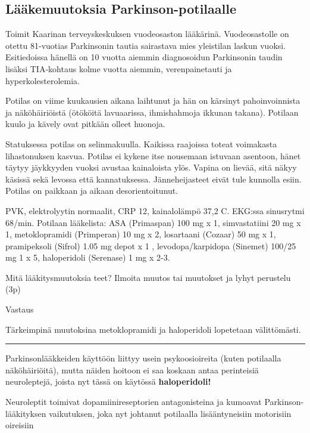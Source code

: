 \documentclass[
]{book}
\begin{document}
\subsection{Lääkemuutoksia Parkinson-potilaalle}\label{luxe4uxe4kemuutoksia-parkinson-potilaalle}

Toimit Kaarinan terveyskeskuksen vuodeosaston lääkärinä. Vuodeosastolle on otettu 81-vuotias Parkinsonin tautia sairastava mies yleistilan laskun vuoksi. Esitiedoissa
hänellä on 10 vuotta aiemmin diagnosoidun Parkinsonin taudin lisäksi TIA-kohtaus kolme vuotta aiemmin, verenpainetauti ja hyperkolesterolemia.

Potilas on viime kuukausien aikana laihtunut ja hän on kärsinyt pahoinvoinnista ja näköhäiriöistä (ötököitä lavuaarissa, ihmishahmoja ikkunan takana). Potilaan kuulo ja kävely ovat pitkään olleet huonoja.

Statuksessa potilas on selinmakuulla. Kaikissa raajoissa toteat voimakasta lihastonuksen kasvua. Potilas ei kykene itse nousemaan istuvaan asentoon, hänet täytyy jäykkyyden vuoksi avustaa kainaloista ylös. Vapina on lievää, sitä näkyy käsissä sekä levossa että kannatuksessa. Jänneheijasteet eivät tule kunnolla esiin. Potilas on paikkaan ja aikaan desorientoitunut.

PVK, elektrolyytin normaalit, CRP 12, kainalolämpö 37,2 C. EKG:ssa sinusrytmi 68/min. Potilaan lääkelista: ASA (Primaspan) 100 mg x 1, simvastatiini 20 mg x 1, metoklopramidi (Primperan) 10 mg x 2, losartaani (Cozaar) 50 mg x 1, pramipeksoli (Sifrol) 1.05 mg depot x 1 , levodopa/karpidopa (Sinemet) 100/25 mg 1 x 5, haloperidoli (Serenase) 1 mg x 2-3.

Mitä lääkitysmuutoksia teet? Ilmoita muutos tai muutokset ja lyhyt perustelu (3p)

Vastaus

Tärkeimpinä muutoksina metoklopramidi ja haloperidoli lopetetaan välittömästi.

\begin{center}\rule{0.5\linewidth}{0.5pt}\end{center}

Parkinsonlääkkeiden käyttöön liittyy usein psykoosioireita (kuten potilaalla näköhäiriöitä), mutta näiden hoitoon ei saa koskaan antaa perinteisiä neuroleptejä, joista nyt tässä on käytössä \textbf{haloperidoli!}

Neuroleptit toimivat dopamiinireseptorien antagonisteina ja kumoavat Parkinson-lääkityksen vaikutuksen, joka nyt johtanut potilaalla lisääntyneisiin motorisiin oireisiin
\end{document}
